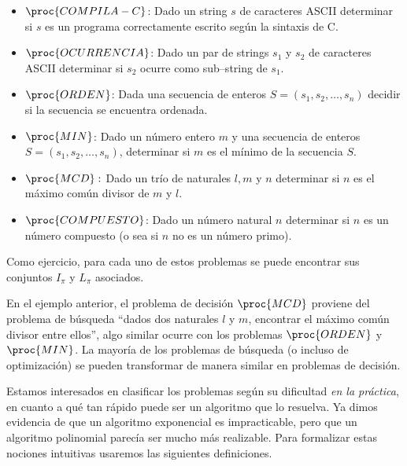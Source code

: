 \begin{ejemplo}
\begin{itemize}
  \item $\proc{COMPILA-C}$: Dado un string $s$ de caracteres ASCII determinar si $s$ es un programa correctamente escrito según la sintaxis de C.
  \item $\proc{OCURRENCIA}$: Dado un par de strings $s_1$ y $s_2$ de caracteres ASCII determinar si $s_2$ ocurre como sub--string de $s_1$.
  \item $\proc{ORDEN}$: Dada una secuencia de enteros $S=(s_1,s_2,\ldots,s_n)$ decidir si la secuencia se encuentra ordenada.
  \item $\proc{MIN}$: Dado un número entero $m$ y una secuencia de enteros $S=(s_1,s_2,\ldots,s_n)$, determinar si $m$ es el mínimo de la secuencia $S$.
  \item $\proc{MCD}:$ Dado un trío de naturales $l,m$ y $n$ determinar si $n$ es el máximo común divisor de $m$ y $l$.
  \item $\proc{COMPUESTO}$: Dado un número natural $n$ determinar si $n$ es un número compuesto (o sea si $n$ no es un número primo).
\end{itemize}
Como ejercicio, para cada uno de estos problemas se puede encontrar sus conjuntos $I_\pi$ y $L_\pi$ asociados.
\end{ejemplo}

En el ejemplo anterior, el problema de decisión $\proc{MCD}$ proviene del problema de búsqueda ``dados dos naturales $l$ y $m$, encontrar el máximo común divisor entre ellos'', algo similar ocurre con los problemas $\proc{ORDEN}$ y $\proc{MIN}$.
La mayoría de los problemas de búsqueda (o incluso de optimización) se pueden transformar de manera similar en problemas de decisión.

Estamos interesados en clasificar los problemas según su dificultad \emph{en la práctica}, en cuanto a qué tan rápido puede ser un algoritmo que lo resuelva.
Ya dimos evidencia de que un algoritmo exponencial es impracticable, pero que un algoritmo polinomial parecía ser mucho más realizable.
Para formalizar estas nociones intuitivas usaremos las siguientes definiciones.

